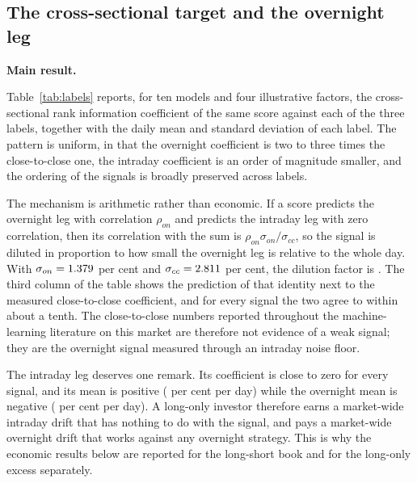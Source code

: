 \documentclass[pdflatex,sn-mathphys-ay]{sn-jnl}
\theoremstyle{thmstyleone}%
\theoremstyle{thmstyletwo}%
\theoremstyle{thmstyletwo}%
\begin{document}
\begin{table}[tbp]
	\centering
	\caption{Friedman test across the panel with mean ranks, and Wilcoxon signed-rank tests of MambaATM against every other model, paired by stock and Holm corrected over the family of comparisons.}
	\label{tab:stats}
	
\end{table}

\subsection{The cross-sectional target and the overnight leg}
\textbf{Main result.}

Table~\ref{tab:labels} reports, for ten models and four illustrative factors, the cross-sectional rank
information coefficient of the same score against each of the three labels, together with the daily
mean and standard deviation of each label. The pattern is uniform, in that the overnight coefficient
is two to three times the close-to-close one, the intraday coefficient is an order of magnitude
smaller, and the
ordering of the signals is broadly preserved across labels.

\begin{table}[!ht]
	\centering
	\caption{Cross-sectional rank information coefficient of each signal against the close-to-close label, the overnight label and the intraday label. The final column is the close-to-close coefficient predicted from the overnight coefficient and the ratio of the two labels' standard deviations.}
	\label{tab:labels}
	
\end{table}

The mechanism is arithmetic rather than economic. If a score predicts the overnight leg with
correlation $\rho_{on}$ and predicts the intraday leg with zero correlation, then its correlation with
the sum is $\rho_{on}\sigma_{on}/\sigma_{cc}$, so the signal is diluted in proportion to how small the
overnight leg is relative to the whole day. With $\sigma_{on} = 1.379$ per cent and
$\sigma_{cc} = 2.811$ per cent, the dilution factor is \dilutionRatio. The third column of the table
shows the prediction of that identity next to the measured close-to-close coefficient, and for every
signal the two agree to within about a tenth. The close-to-close numbers reported throughout the
machine-learning literature on this market are therefore not evidence of a weak signal; they are the
overnight signal measured through an intraday noise floor.

The intraday leg deserves one remark. Its coefficient is close to zero for every signal,
and its mean is positive (\idMean{} per cent per day) while the overnight mean is negative
(\onMean{} per cent per day). A long-only investor therefore earns a market-wide intraday drift that
has nothing to do with the signal, and pays a market-wide overnight drift that works against any
overnight strategy. This is why the economic results below are reported for the long-short book and
for the long-only excess separately.
\end{document}
